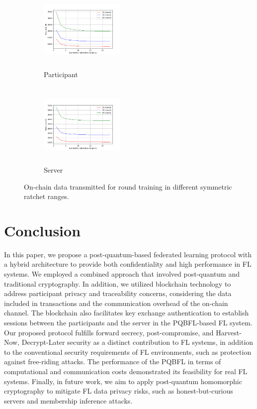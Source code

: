 \documentclass[a4paper,fleqn]{cas-dc}
\begin{document}
\begin{figure}[ht]
    \centering
    \begin{subfigure}[b]{0.23\textwidth}
        \centering
        \includegraphics[width=1.6in,height=1.6in]{Images/client_onchain.png}
        \caption{Participant}
    \end{subfigure}
    \hspace{0.001\linewidth}
    \begin{subfigure}[b]{0.23\textwidth}
        \centering
        \includegraphics[width=1.6in,height=1.6in]{Images/server_onchain.png}
        \caption{Server}
    \end{subfigure}
    \caption{On-chain data transmitted for round training in different symmetric ratchet ranges.}
    \label{fig: data_transmitted_on-chain}
\end{figure}

\section{Conclusion}
\label{Conclusion and Future Work}
In this paper, we propose a post-quantum-based federated learning protocol with a hybrid architecture to provide both confidentiality and high performance in FL systems.  
We employed a combined approach that involved post-quantum and traditional cryptography.  
In addition, we utilized blockchain technology to address participant privacy and traceability concerns, considering the data included in transactions and the communication overhead of the on-chain channel.
The blockchain also facilitates key exchange authentication to establish sessions between the participants and the server in the PQBFL-based FL system. 
Our proposed protocol fulfills forward secrecy, post-compromise, and Harvest-Now, Decrypt-Later security as a distinct contribution to FL systems, in addition to the conventional security requirements of FL environments, such as protection against free-riding attacks.  
The performance of the PQBFL in terms of computational and communication costs demonstrated its feasibility for real FL systems.  
Finally, in future work, we aim to apply post-quantum homomorphic cryptography to mitigate FL data privacy risks, such as honest-but-curious servers and membership inference attacks.
\end{document}
